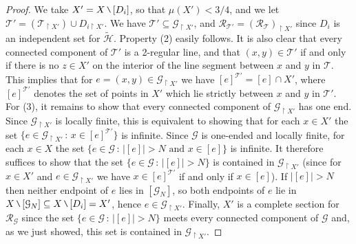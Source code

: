 \documentclass[11pt]{amsart}
\theoremstyle{definition}
\theoremstyle{plain}
\newcommand{\<}{\langle}
\renewcommand{\>}{\rangle}
\newcommand{\Ggraph}{\mathcal{G}}
\newcommand{\Hgraph}{\mathcal{H}}
\newcommand{\Tgraph}{\mathcal{T}}
\newcommand\RR{\mathscr{R}}
\newcommand{\mysetminusD}{\hbox{\tikz{\draw[line width=0.6pt,line cap=round] (3pt,0) -- (0,6pt);}}}
\newcommand{\mysetminusT}{\mysetminusD}
\newcommand{\mysetminusS}{\hbox{\tikz{\draw[line width=0.45pt,line cap=round] (2pt,0) -- (0,4pt);}}}
\newcommand{\mysetminusSS}{\hbox{\tikz{\draw[line width=0.4pt,line cap=round] (1.5pt,0) -- (0,3pt);}}}
\newcommand{\mysetminus}{\mathbin{\mathchoice{\mysetminusD}{\mysetminusT}{\mysetminusS}{\mysetminusSS}}}%
\begin{document}
\begin{proof}
We take $X' = X\mysetminus [D_i]$, so that $\mu (X')<3/4$, and we let ${\Tgraph}' = ( {\Tgraph}_{\restriction  X' }) \cup D_{i \restriction X'}$. We have ${\Tgraph}'\subseteq {\Ggraph}_{\restriction  X'}$, and $\RR_{{\Tgraph}'} = (\RR_{\Tgraph})_{\restriction  X'}$ since $D_i$ is an independent set for $\widetilde{{\Hgraph}}$. Property (2) easily follows. It is also clear that every connected component of ${\Tgraph}'$ is a 2-regular line, and that $(x,y)\in \mathcal{\Tgraph}'$ if and only if there is no $z\in X'$ on the interior of the line segment between $x$ and $y$ in $\Tgraph$. This implies that for $e=(x,y)\in {\Ggraph}_{\restriction X'}$ we have $[e]^{\Tgraph '} = [e]\cap X'$, where $[e]^{\Tgraph '}$ denotes the set of points in $X'$ which lie strictly between $x$ and $y$ in ${\Tgraph}'$. For (3), it remains to show that every connected component of ${\Ggraph}_{\restriction  X'}$ has one end. Since ${\Ggraph}_{\restriction X'}$ is locally finite, this is equivalent to showing that for each $x\in X'$ the set $\{ e\in {\Ggraph}_{\restriction X'} \, : \, x\in [e]^{\Tgraph '} \}$ is infinite. Since ${\Ggraph}$ is one-ended and locally finite, for each $x\in X$ the set $\{ e\in {\Ggraph} \, : \, |[e]|> N \text{ and }x\in [e] \}$ is infinite. It therefore suffices to show that the set $\{ e\in {\Ggraph} \, : \, |[e] |> N \}$ is contained in ${\Ggraph}_{\restriction  X'}$ (since for $x\in X'$ and $e\in {\Ggraph}_{\restriction X'}$ we have $x\in [e]^{\Tgraph '}$ if and only if $x\in [e]$). If $|[e]|>N$ then neither endpoint of $e$ lies in $[\Ggraph _N]$, so both endpoints of $e$ lie in $X\mysetminus [\Ggraph _N]\subseteq X\mysetminus [D_i] = X'$, hence $e\in {\Ggraph}_{\restriction X'}$. Finally, $X'$ is a complete section for $\RR_{\Ggraph}$ since the set $\{ e\in {\Ggraph} \, : \, |[e]| >N \}$ meets every connected component of $\mathcal{\Ggraph}$ and, as we just showed, this set is contained in ${\Ggraph}_{\restriction X'}$.
\end{proof}
\end{document}
